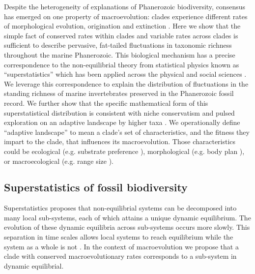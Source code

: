 \documentclass[12pt]{article}
\let\citep=\cite
\begin{document}
Despite the heterogeneity of explanations of Phanerozoic biodiversity,
consensus has emerged on one property of macroevolution: clades
experience different rates of morphological evolution, origination and
extinction \citep{simpson1953, sepkoski1984, gilinsky1994,
  rabosky2014}. Here we show that the simple fact of conserved rates
within clades and variable rates across clades is sufficient to
describe pervasive, fat-tailed fluctuations in taxonomic richness
throughout the marine Phanerozoic.  This biological mechanism has a
precise correspondence to the non-equilibrial theory from statistical
physics known as ``superstatistics'' \citep{beck2003} which has been
applied across the physical and social sciences \citep{beck2004,
  fuentes2009}. We leverage this correspondence to explain the
distribution of fluctuations in the standing richness of marine
invertebrates preserved in the Phanerozoic fossil record. We further
show that the specific mathematical form of this superstatistical
distribution is consistent with niche conservatism
\citep{roy2009range, hopkins2014} and pulsed exploration on an
adaptive landscape by higher taxa \citep{simpson1953,
  eldredgeGould1972, newman1985adaptive, hopkins2014}. We
operationally define ``adaptive landscape'' to mean a clade's set of
characteristics, and the fitness they impart to the clade, that
influences its macroevolution. Those characteristics could be
ecological (e.g.  substrate preference \citep{bambach1983, bush2007,
  hopkins2014}), morphological (e.g. body plan \citep{erwin2012}), or
macroecological (e.g. range size \citep{harnik2011,
  foote2008paleobiol}).


\subsection{Superstatistics of fossil biodiversity}

Superstatistics \citep{beck2003} proposes that non-equilibrial systems
can be decomposed into many local sub-systems, each of which attains a
unique dynamic equilibrium. The evolution of these dynamic equilibria
across sub-systems occurs more slowly. This separation in time scales
allows local systems to reach equilibrium while the system as a whole
is not \citep{beck2003}.  In the context of macroevolution we propose
that a clade with conserved macroevolutionary rates corresponds to a
sub-system in dynamic equilibrial.
\end{document}
